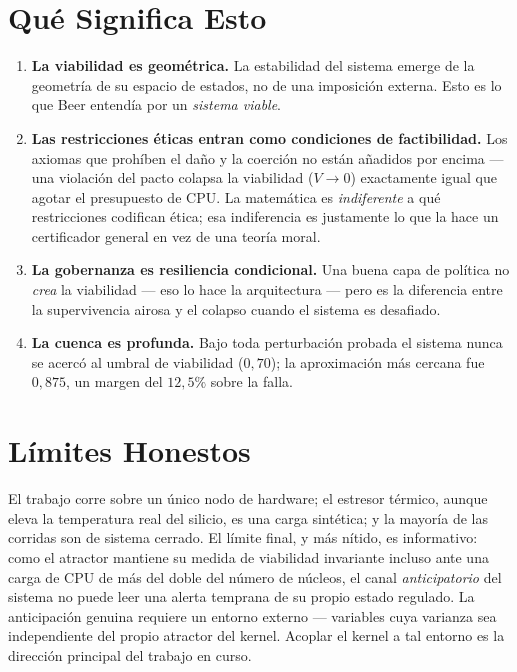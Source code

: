\documentclass[11pt, a4paper]{article}
\begin{document}
\section*{Qué Significa Esto}

\begin{enumerate}
  \item \textbf{La viabilidad es geométrica.} La estabilidad del sistema emerge de la
        geometría de su espacio de estados, no de una imposición externa. Esto es lo
        que Beer entendía por un \emph{sistema viable}.

  \item \textbf{Las restricciones éticas entran como condiciones de factibilidad.} Los
        axiomas que prohíben el daño y la coerción no están añadidos por encima --- una
        violación del pacto colapsa la viabilidad ($V \to 0$) exactamente igual que
        agotar el presupuesto de CPU. La matemática es \emph{indiferente} a qué
        restricciones codifican ética; esa indiferencia es justamente lo que la hace un
        certificador general en vez de una teoría moral.

  \item \textbf{La gobernanza es resiliencia condicional.} Una buena capa de política
        no \emph{crea} la viabilidad --- eso lo hace la arquitectura --- pero es la
        diferencia entre la supervivencia airosa y el colapso cuando el sistema es
        desafiado.

  \item \textbf{La cuenca es profunda.} Bajo toda perturbación probada el sistema nunca
        se acercó al umbral de viabilidad ($0{,}70$); la aproximación más cercana fue
        $0{,}875$, un margen del $12{,}5\%$ sobre la falla.
\end{enumerate}

\section*{Límites Honestos}

El trabajo corre sobre un único nodo de hardware; el estresor térmico, aunque eleva la
temperatura real del silicio, es una carga sintética; y la mayoría de las corridas son
de sistema cerrado. El límite final, y más nítido, es informativo: como el atractor
mantiene su medida de viabilidad invariante incluso ante una carga de CPU de más del
doble del número de núcleos, el canal \emph{anticipatorio} del sistema no puede leer
una alerta temprana de su propio estado regulado. La anticipación genuina requiere un
entorno externo --- variables cuya varianza sea independiente del propio atractor del
kernel. Acoplar el kernel a tal entorno es la dirección principal del trabajo en curso.
\end{document}
